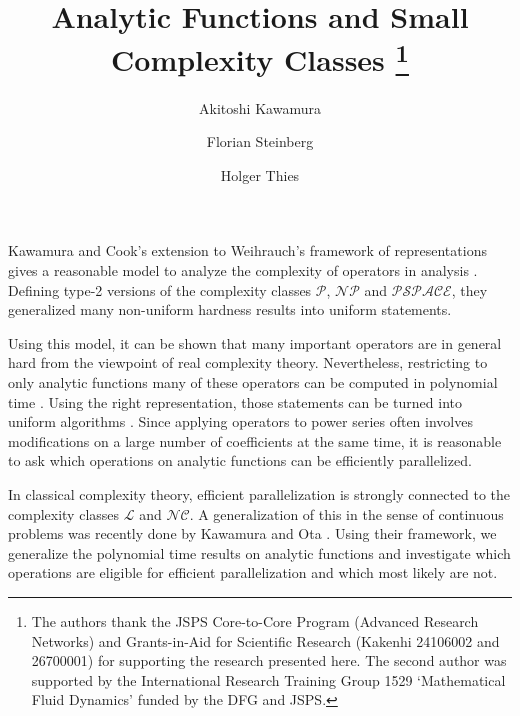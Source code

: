 \documentclass{llncs}
\newcommand{\p}{\ensuremath{\mathcal P}\xspace}
\newcommand{\np}{\ensuremath{\mathcal{NP}}\xspace}
\newcommand{\cl}{\ensuremath{\mathcal{L}}\xspace}
\newcommand{\nc}{\ensuremath{\mathcal{NC}}\xspace}
\newcommand{\pspace}{\ensuremath{ \mathcal{PSPACE}}\xspace}
\begin{document}
\title{Analytic Functions and Small Complexity Classes \thanks{The authors thank the JSPS Core-to-Core Program (Advanced Research Networks) and Grants-in-Aid for Scientific Research (Kakenhi 24106002 and 26700001) for supporting the research presented here. The second author was supported by the International Research Training Group 1529 ‘Mathematical Fluid Dynamics’ funded by the DFG and JSPS.}}


\author{Akitoshi Kawamura \and Florian Steinberg \and Holger Thies }

\maketitle

Kawamura and Cook's extension to Weihrauch's framework of representations \cite{Weihrauch} gives a reasonable model to analyze the complexity of operators in analysis \cite{AkiACM}.
Defining type-2 versions of the complexity classes \p, \np and \pspace, they generalized many non-uniform hardness results into uniform statements.

Using this model, it can be shown that many important operators are in general hard from the viewpoint of real complexity theory. 
Nevertheless, restricting to only analytic functions many of these operators can be computed in polynomial time \cite{MR1137517}.
Using the right representation, those statements can be turned into uniform algorithms \cite{Kawamura2012}.
Since applying operators to power series often involves modifications on a large number of coefficients at the same time, it is reasonable to ask which operations on analytic functions can be efficiently parallelized.

In classical complexity theory, efficient parallelization is strongly connected to the complexity classes \cl and \nc.
A generalization of this in the sense of continuous problems was recently done by Kawamura and Ota \cite{Kawamura2014}.
Using their framework, we generalize the polynomial time results on analytic functions and investigate which operations are eligible for efficient parallelization and which most likely are not.
\end{document}
